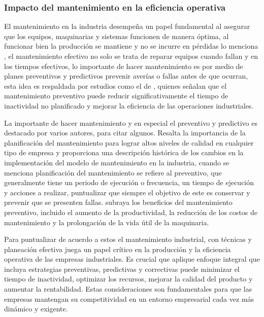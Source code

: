 \documentclass[
  11pt,
  bookmarksnumbered]{article}
\begin{document}
\hypertarget{impacto-del-mantenimiento-en-la-eficiencia-operativa}{%
\subsubsection{Impacto del mantenimiento en la eficiencia operativa}\label{impacto-del-mantenimiento-en-la-eficiencia-operativa}}

El mantenimiento en la industria desempeña un papel fundamental al asegurar que los equipos, maquinarias y sistemas funcionen de manera óptima, al funcionar bien la producción se mantiene y no se incurre en pérdidas lo menciona \textcite{Jardine2013}, el mantenimiento efectivo no solo se trata de reparar equipos cuando fallan y en los tiempos efectivos, lo importante de hacer mantenimiento es por medio de planes preventivos y predictivos prevenir averías o fallas antes de que ocurran, esta idea es respaldada por estudios como el de \textcite{Kumar2018}, quienes señalan que el mantenimiento preventivo puede reducir significativamente el tiempo de inactividad no planificado y mejorar la eficiencia de las operaciones industriales.

La importante de hacer mantenimiento y en especial el preventivo y predictivo es destacado por varios autores, para citar algunos.
\textcite{Olarte2010ImportanciaDM} Resalta la importancia de la planificación del mantenimiento para lograr altos niveles de calidad en cualquier tipo de empresa y proporciona una descripción histórica de los cambios en la implementación del modelo de mantenimiento en la industria, cuando se menciona planificación del mantenimiento se refiere al preventivo, que generalmente tiene un periodo de ejecución o frecuencia, un tiempo de ejecución y acciones a realizar, puntualizar que siempre el objetivo de este es conservar y prevenir que se presenten fallas.
\textcite{ARROYOVACA2022ImportanciaDL} subraya los beneficios del mantenimiento preventivo, incluido el aumento de la productividad, la reducción de los costos de mantenimiento y la prolongación de la vida útil de la maquinaria.

Para puntualizar de acuerdo a estos el mantenimiento industrial, con técnicas y planeación efectiva juega un papel crítico en la producción y la eficiencia operativa de las empresas industriales.
Es crucial que aplique enfoque integral que incluya estrategias preventivas, predictivas y correctivas puede minimizar el tiempo de inactividad, optimizar los recursos, mejorar la calidad del producto y aumentar la rentabilidad.
Estas consideraciones son fundamentales para que las empresas mantengan su competitividad en un entorno empresarial cada vez más dinámico y exigente.
\end{document}
